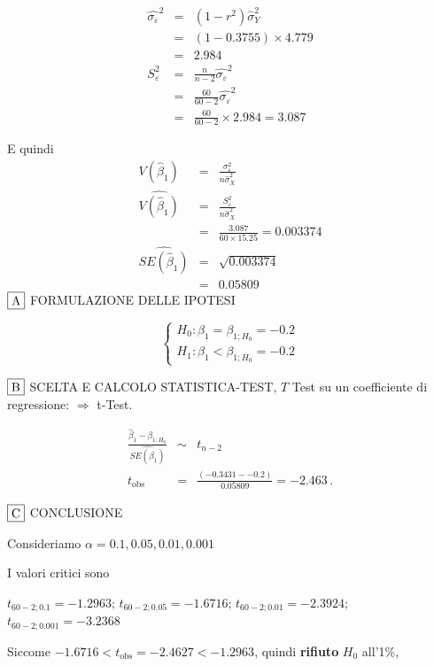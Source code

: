 \documentclass[
  11pt,
]{book}
\theoremstyle{mytheoremstyle}
\theoremstyle{mydefstyle}
\newenvironment{sol}
  {
  \begin{tcolorbox}[enhanced,breakable,arc=0.1mm,boxrule=1pt,colback=white,colframe=iblue,
  title=\bf \fontfamily{lmss}\selectfont \hspace{.5 cm} Soluzione,drop fuzzy shadow]

}{
\end{tcolorbox}
  }
\begin{document}
\begin{sol}
\begin{eqnarray*}
\hat{\sigma_\varepsilon}^2&=&(1-r^2)\hat\sigma_Y^2\\
&=& (1- 0.3755 )\times 4.779 \\
   &=&  2.984 \\
   S_\varepsilon^2 &=& \frac{n} {n-2} \hat{\sigma_\varepsilon}^2\\
   &=&  \frac{ 60 } { 60 -2} \hat{\sigma_\varepsilon}^2 \\
 &=&  \frac{ 60 } { 60 -2} \times  2.984  =  3.087  
\end{eqnarray*}

E quindi\begin{eqnarray*}
V(\hat\beta_{1}) &=& \frac{\sigma_{\varepsilon}^{2}} {n \hat{\sigma}^{2}_{X}} \\
\widehat{V(\hat\beta_{1})} &=& \frac{S_{\varepsilon}^{2}} {n \hat{\sigma}^{2}_{X}} \\
 &=& \frac{ 3.087 } { 60 \times  15.25 } =  0.003374 \\
 \widehat{SE(\hat\beta_{1})}        &=&  \sqrt{ 0.003374 }\\
 &=&  0.05809 
\end{eqnarray*}
\(\fbox{A}\) FORMULAZIONE DELLE IPOTESI

\[\begin{cases}
   H_0: \beta_1 = \beta_{1;H_0}=-0.2 \\
   H_1: \beta_1 < \beta_{1;H_0}=-0.2 
   \end{cases}\]

\(\fbox{B}\) SCELTA E CALCOLO STATISTICA-TEST, \(T\)
Test su un coefficiente di regressione: \(\Rightarrow\) t-Test.

\begin{eqnarray*}
 \frac{\hat\beta_{ 1 } - \beta_{ 1 ;H_0}} {\widehat{SE(\hat\beta_{ 1 })}}&\sim&t_{n-2}\\
   t_{\text{obs}}
&=& \frac{ ( -0.3431 -  -0.2 )} { 0.05809 }
 =   -2.463 \, .
\end{eqnarray*}

\(\fbox{C}\) CONCLUSIONE

Consideriamo \(\alpha=0.1, 0.05, 0.01, 0.001\)

I valori critici sono

\(t_{60-2;0.1}=-1.2963\); \(t_{60-2;0.05}=-1.6716\); \(t_{60-2;0.01}=-2.3924\); \(t_{60-2;0.001}=-3.2368\)

Siccome \(-1.6716<t_\text{obs}=-2.4627<-1.2963\), quindi \textbf{rifiuto} \(H_0\) all'1\%,


\end{sol}
\end{document}

